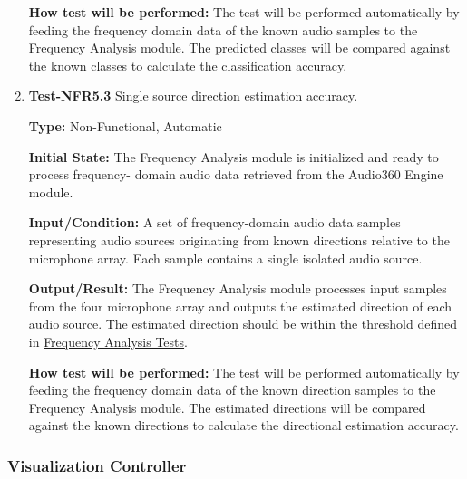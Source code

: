 \documentclass[12pt, titlepage]{article}
\begin{document}
\begin{enumerate}
\textbf{How test will be performed:}
The test will be performed automatically by feeding the frequency domain data of
the known audio samples to the Frequency Analysis module. The predicted classes
will be compared against the known classes to calculate the classification
accuracy.

\item{\textbf{Test-NFR5.3} Single source direction estimation accuracy.\\}

\textbf{Type:} Non-Functional, Automatic

\textbf{Initial State:}
The Frequency Analysis module is initialized and ready to process frequency-
domain audio data retrieved from the Audio360 Engine module.

\textbf{Input/Condition:}
A set of frequency-domain audio data samples representing audio sources
originating from known directions relative to the microphone array. Each sample
contains a single isolated audio source.

\textbf{Output/Result:}
The Frequency Analysis module processes input samples from the four microphone
array and outputs the estimated direction of each audio source. The estimated
direction should be within the threshold defined in
\hyperref[sec:freq-analysis-tests]{Frequency Analysis Tests}.

\textbf{How test will be performed:}
The test will be performed automatically by feeding the frequency domain data of
the known direction samples to the Frequency Analysis module. The estimated
directions will be compared against the known directions to calculate the
directional estimation accuracy.


\end{enumerate}

\subsubsection{Visualization Controller}
		
\end{document}
